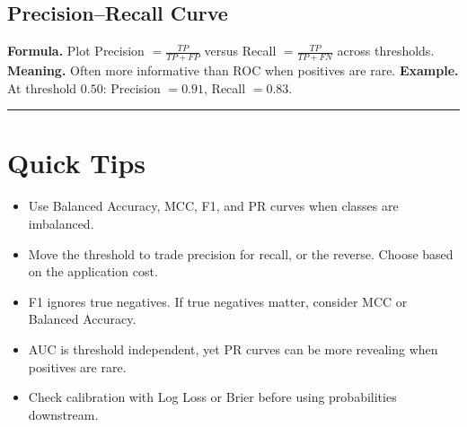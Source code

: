 \documentclass[a4paper,11pt]{article}
\newcommand{\exline}{\vspace{0.35em}\hrule\vspace{0.6em}}
\begin{document}
\subsection*{Precision–Recall Curve}
\textbf{Formula.} Plot Precision \(=\frac{TP}{TP+FP}\) versus Recall \(=\frac{TP}{TP+FN}\) across thresholds.  
\textbf{Meaning.} Often more informative than ROC when positives are rare.  
\textbf{Example.} At threshold \(0.50\): Precision \(=0.91\), Recall \(=0.83\).

\begin{center}
\end{center}

\exline

\section{Quick Tips}
\begin{itemize}
  \item Use Balanced Accuracy, MCC, F1, and PR curves when classes are imbalanced.
  \item Move the threshold to trade precision for recall, or the reverse. Choose based on the application cost.
  \item F1 ignores true negatives. If true negatives matter, consider MCC or Balanced Accuracy.
  \item AUC is threshold independent, yet PR curves can be more revealing when positives are rare.
  \item Check calibration with Log Loss or Brier before using probabilities downstream.
\end{itemize}
\end{document}
